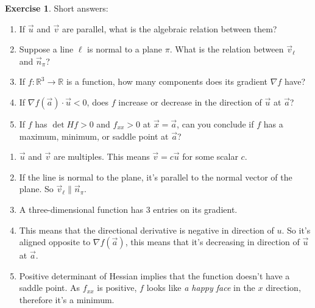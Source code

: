\documentclass[12pt]{article}
\theoremstyle{plain}
\theoremstyle{definition}
\newtheorem{Ej}[Th]{Exercise}         %
\theoremstyle{remark}
\renewcommand{\l}{\ell}
\newcommand{\bR}{\mathbb{R}}        %
\renewcommand{\:}{\colon}           %
\renewcommand{\.}{\Cdot}                %
\newcommand{\nb}{\nabla}
\begin{document}

\begin{Ej}
  Short answers:
  \begin{enumerate}
   \item If $\vec{u}$ and $\vec{v}$ are parallel, what is the algebraic relation between them?
   \item Suppose a line $\l$ is normal to a plane $\pi$. What is the relation between $\vec{v}_\l$ and $\vec{n}_\pi$?
   \item If $f:\bR^3 \to \bR$ is a function, how many components does its gradient $\nabla f$ have?
   \item If $\nabla f(\vec{a}) \cdot \vec{u} < 0$, does $f$ increase or decrease in the direction of $\vec{u}$ at $\vec{a}$?
   \item If $f$ has $\det Hf > 0$ and $f_{xx} > 0$ at $\vec{x} = \vec{a}$, can you conclude if $f$ has a maximum, minimum, or saddle point at $\vec{a}$?
  \end{enumerate}
\end{Ej}

    \begin{ptcb}
     \begin{enumerate}
      \item $\vec{u}$ and $\vec v$ are multiples. This means $\vec{v}=c\vec u$ for some scalar $c$.
      \item If the line is normal to the plane, it's parallel to the normal vector of the plane. So $\vec{v}_\l\parallel\vec n_\pi$.
      \item A three-dimensional function has 3 entries on its gradient.
      \item This means that the directional derivative is negative in direction of $u$. So it's aligned opposite to $\nb f(\vec a)$, this means that it's decreasing in direction of $\vec u$ at $\vec a$.
      \item Positive determinant of Hessian implies that the function doesn't have a saddle point. As $f_{xx}$ is positive, $f$ looks like \emph{a happy face} in the $x$ direction, therefore it's a minimum. 
     \end{enumerate}
    \end{ptcb}
\end{document}
